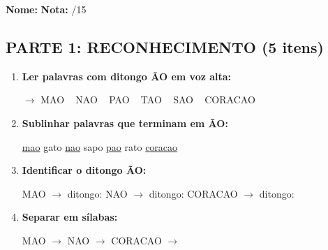 \begin{exercicio}

\noindent\textbf{Nome:} \underline{\hspace{4cm}} \quad \textbf{Nota:} \underline{\hspace{1cm}}/15

\subsection*{PARTE 1: RECONHECIMENTO (5 itens)}

\begin{enumerate}
  \item \textbf{Ler palavras com ditongo \~AO em voz alta:}
  \begin{center}
  $\rightarrow$ MAO  ~  NAO  ~  PAO  ~  TAO  ~  SAO  ~  CORACAO
  \end{center}

  \item \textbf{Sublinhar palavras que terminam em \~AO:}
  \begin{center}
  \uline{mao} \quad gato \quad \uline{nao} \quad sapo \quad \uline{pao} \quad rato \quad \uline{coracao}
  \end{center}

  \item \textbf{Identificar o ditongo \~AO:}
  \begin{center}
  MAO $\rightarrow$ ditongo: \underline{\hspace{1cm}} \quad NAO $\rightarrow$ ditongo: \underline{\hspace{1cm}} \quad CORACAO $\rightarrow$ ditongo: \underline{\hspace{1cm}}
  \end{center}

  \item \textbf{Separar em sílabas:}
  \begin{center}
  MAO $\rightarrow$ \underline{\hspace{1.5cm}} \quad NAO $\rightarrow$ \underline{\hspace{1.5cm}} \quad CORACAO $\rightarrow$ \underline{\hspace{1.5cm}} \underline{\hspace{1.5cm}} \underline{\hspace{1.5cm}}
  \end{center}


\end{enumerate}
\end{exercicio}
